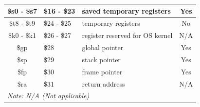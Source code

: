 \documentclass[
  oneside,
  11pt, a4paper,
  footinclude=true,
  headinclude=true,
  cleardoublepage=empty
]{scrbook}
\begin{document}
\begin{table}[h!]
\begin{tabular}{cllc}
\multicolumn{1}{|c|}{\$s0 - \$s7}     & \multicolumn{1}{l|}{\$16 - \$23}       & \multicolumn{1}{l|}{saved temporary registers}                                                                                            & \multicolumn{1}{c|}{Yes}                                                                       \\ \hline
\multicolumn{1}{|c|}{\$t8 - \$t9}     & \multicolumn{1}{l|}{\$24 - \$25}       & \multicolumn{1}{l|}{temporary registers}                                                                                                  & \multicolumn{1}{c|}{No}                                                                        \\ \hline
\multicolumn{1}{|c|}{\$k0 - \$k1}     & \multicolumn{1}{l|}{\$26 - \$27}       & \multicolumn{1}{l|}{register reserved for OS kernel}                                                                                        & \multicolumn{1}{c|}{N/A}                                                                       \\ \hline
\multicolumn{1}{|c|}{\$gp}          & \multicolumn{1}{l|}{\$28}            & \multicolumn{1}{l|}{global pointer}                                                                                                         & \multicolumn{1}{c|}{Yes}                                                                       \\ \hline
\multicolumn{1}{|c|}{\$sp}          & \multicolumn{1}{l|}{\$29}            & \multicolumn{1}{l|}{stack pointer}                                                                                                          & \multicolumn{1}{c|}{Yes}                                                                       \\ \hline
\multicolumn{1}{|c|}{\$fp}          & \multicolumn{1}{l|}{\$30}            & \multicolumn{1}{l|}{frame pointer}                                                                                                          & \multicolumn{1}{c|}{Yes}                                                                       \\ \hline
\multicolumn{1}{|c|}{\$ra}          & \multicolumn{1}{l|}{\$31}            & \multicolumn{1}{l|}{return address}                                                                                                         & \multicolumn{1}{c|}{N/A}                                                                       \\ \hline
\multicolumn{4}{l}{\textit{Note: N/A (Not applicable)}}                                                                                                                                                                                                                                                                  
\end{tabular}
\end{table}
\end{document}

